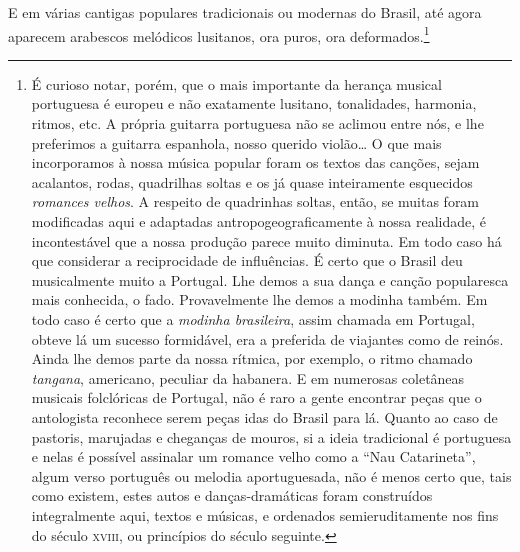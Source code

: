 E em várias cantigas populares tradicionais ou modernas do Brasil, até
agora aparecem arabescos melódicos lusitanos, ora puros, ora deformados.\footnote{É curioso notar, porém, que o mais importante da herança musical
portuguesa é europeu e não exatamente lusitano, tonalidades, harmonia,
ritmos, etc. A própria guitarra portuguesa não se aclimou entre nós, e
lhe preferimos a guitarra espanhola, nosso querido violão\ldots{} O que mais
incorporamos à nossa música popular foram os textos das canções, sejam
acalantos, rodas, quadrilhas soltas e os já quase inteiramente
esquecidos \textit{romances velhos}. A respeito de quadrinhas soltas, então,
se muitas foram modificadas aqui e adaptadas antropogeograficamente à
nossa realidade, é incontestável que a nossa produção parece muito
diminuta. Em todo caso há que considerar a reciprocidade de influências.
É certo que o Brasil deu musicalmente muito a Portugal. Lhe demos a sua
dança e canção popularesca mais conhecida, o fado. Provavelmente lhe
demos a modinha também. Em todo caso é certo que a \textit{modinha
brasileira}, assim chamada em Portugal, obteve lá um sucesso
formidável, era a preferida de viajantes como de reinós. Ainda lhe demos
parte da nossa rítmica, por exemplo, o ritmo chamado \textit{tangana},
americano, peculiar da habanera. E em numerosas coletâneas musicais
folclóricas de Portugal, não é raro a gente encontrar peças que o
antologista reconhece serem peças idas do Brasil para lá. Quanto ao caso
de pastoris, marujadas e cheganças de mouros, si a ideia tradicional é
portuguesa e nelas é possível assinalar um romance velho como a ``Nau
Catarineta'', algum verso português ou melodia aportuguesada, não é
menos certo que, tais como existem, estes autos e danças-dramáticas
foram construídos integralmente aqui, textos e músicas, e ordenados
semieruditamente nos fins do século \textsc{xviii}, ou princípios do século
seguinte.}


